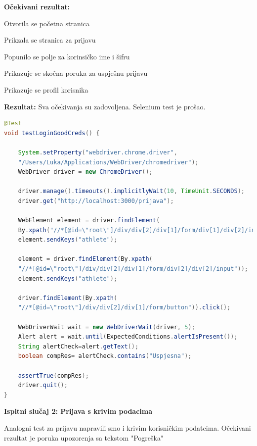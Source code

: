 			 \noindent\textbf{Očekivani rezultat:}
			 
			 \begin{packed_enum}
			 	
			 	\item Otvorila se početna stranica
			 	\item Prikzala se stranica za prijavu
			 	\item Popunilo se polje za korinsičko ime i šifru
			 	\item Prikazuje se skočna poruka za uspješnu prijavu
			 	\item Prikazuje se profil korisnika
			 	
			 	
			 	
			 \end{packed_enum}
			 
			 \noindent\textbf{Rezultat:} Sva očekivanja su zadovoljena. Selenium test je prošao.
			 
			 
			 \begin{lstlisting}[language=Java,caption={testLoginGoodCreds},label=DescriptiveLabel]	
@Test
void testLoginGoodCreds() {

	System.setProperty("webdriver.chrome.driver", 
	"/Users/Luka/Applications/WebDriver/chromedriver");
	WebDriver driver = new ChromeDriver();

	driver.manage().timeouts().implicitlyWait(10, TimeUnit.SECONDS);
	driver.get("http://localhost:3000/prijava");

	WebElement element = driver.findElement(
	By.xpath("//*[@id=\"root\"]/div/div[2]/div[1]/form/div[1]/div[2]/input"));        
	element.sendKeys("athlete");

	element = driver.findElement(By.xpath(
	"//*[@id=\"root\"]/div/div[2]/div[1]/form/div[2]/div[2]/input"));
	element.sendKeys("athlete");

	driver.findElement(By.xpath(
	"//*[@id=\"root\"]/div/div[2]/div[1]/form/button")).click();

	WebDriverWait wait = new WebDriverWait(driver, 5);
	Alert alert = wait.until(ExpectedConditions.alertIsPresent());
	String alertCheck=alert.getText();
	boolean compRes= alertCheck.contains("Uspjesna");

	assertTrue(compRes);
	driver.quit();
}

			 \end{lstlisting}
			 
			 \hfill\break
			 \noindent\textbf{Ispitni slučaj 2: Prijava s krivim podacima}
		
		Analogni test za prijavu napravili smo i krivim korisničkim podatcima. Očekivani rezultat je poruka upozorenja sa tekstom "Pogreška"
		
